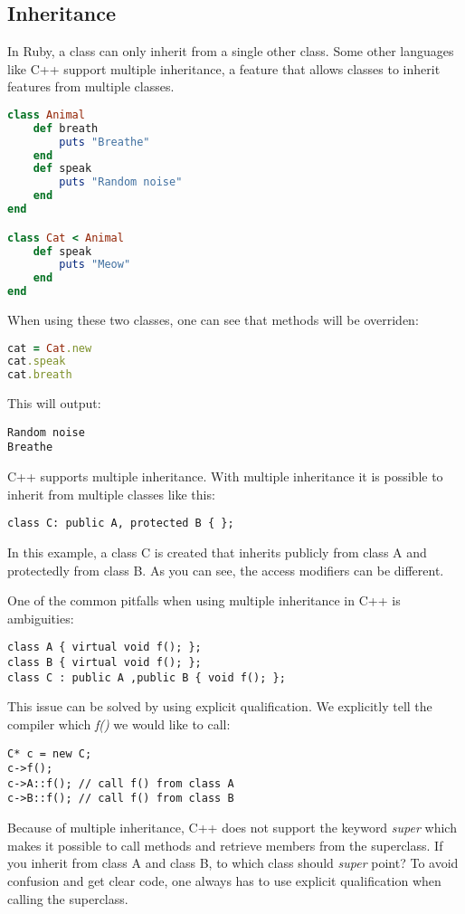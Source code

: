 \documentclass[10pt,a4paper,twocolumn]{article}
\begin{document}
\subsection{Inheritance}
In Ruby, a class can only inherit from a single other class. Some other languages like C++ support multiple inheritance, a feature that allows classes to inherit features from multiple classes.
\begin{lstlisting}[language=Ruby]
class Animal
	def breath
		puts "Breathe"
	end
	def speak
		puts "Random noise"
	end
end

class Cat < Animal
	def speak
		puts "Meow"
	end
end
\end{lstlisting}
When using these two classes, one can see that methods will be overriden:
\begin{lstlisting}[language=Ruby]
cat = Cat.new
cat.speak
cat.breath
\end{lstlisting}
This will output:
\begin{lstlisting}
Random noise
Breathe
\end{lstlisting}

C++ supports multiple inheritance. With multiple inheritance it is possible to inherit from multiple classes like this:

\begin{lstlisting}
class C: public A, protected B { };
\end{lstlisting}

In this example, a class C is created that inherits publicly from class A and protectedly from class B. As you can see, the access modifiers can be different. 

One of the common pitfalls when using multiple inheritance in C++ is ambiguities:

\begin{lstlisting}
class A { virtual void f(); };
class B { virtual void f(); };
class C : public A ,public B { void f(); };
\end{lstlisting}

This issue can be solved by using explicit qualification. We explicitly tell the compiler which \textit{f()} we would like to call:

\begin{lstlisting}
C* c = new C;
c->f();
c->A::f(); // call f() from class A
c->B::f(); // call f() from class B
\end{lstlisting}

Because of multiple inheritance, C++ does not support the keyword \textit{super} which makes it possible to call methods and retrieve members from the superclass. If you inherit from class A and class B, to which class should \textit{super} point? To avoid confusion and get clear code, one always has to use explicit qualification when calling the superclass.
\end{document}
